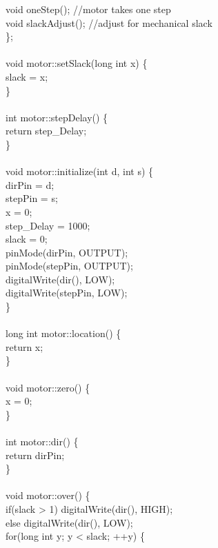 \tabto*{.5cm} void oneStep(); \tabto*{7.5cm}//motor takes one step\\
\tabto*{.5cm} void slackAdjust(); \tabto*{7.5cm}//adjust for mechanical slack\\
\};\\
\\
void motor::setSlack(long int x) \{\\
\tabto*{.5cm} slack = x;\\
\}\\
\\
int motor::stepDelay() \{\\
\tabto*{.5cm} return step\_Delay;\\
\}\\
\\
void motor::initialize(int d, int s) \{\\
\tabto*{.5cm} dirPin = d;\\
\tabto*{.5cm} stepPin = s;\\
\tabto*{.5cm} x = 0;\\
\tabto*{.5cm} step\_Delay = 1000;\\
\tabto*{.5cm} slack = 0;\\
\tabto*{.5cm} pinMode(dirPin, OUTPUT);\\
\tabto*{.5cm} pinMode(stepPin, OUTPUT);\\
\tabto*{.5cm} digitalWrite(dir(), LOW);\\
\tabto*{.5cm} digitalWrite(stepPin, LOW);\\
\}\\
\\
long int motor::location() \{\\
\tabto*{.5cm} return x;\\
\}\\
\\
void motor::zero() \{\\
\tabto*{.5cm} x = 0;\\
\}\\
\\
int motor::dir() \{\\
\tabto*{.5cm} return dirPin;\\
\}\\
\\
void motor::over() \{\\
\tabto*{.5cm} if(slack > 1) digitalWrite(dir(), HIGH);\\
\tabto*{.5cm} else digitalWrite(dir(), LOW);\\
\tabto*{.5cm} for(long int y; y < slack; ++y) \{\\
